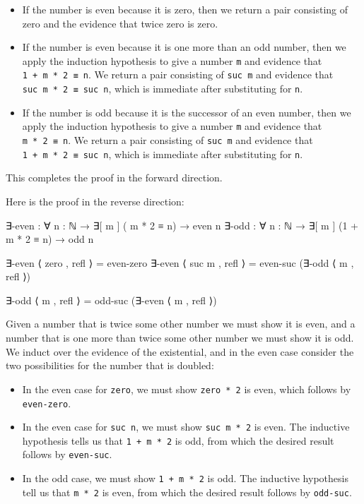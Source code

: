 \begin{itemize}
\item
  If the number is even because it is zero, then we return a pair
  consisting of zero and the evidence that twice zero is zero.
\item
  If the number is even because it is one more than an odd number, then
  we apply the induction hypothesis to give a number \texttt{m} and
  evidence that \texttt{1\ +\ m\ *\ 2\ ≡\ n}. We return a pair
  consisting of \texttt{suc\ m} and evidence that
  \texttt{suc\ m\ *\ 2\ ≡\ suc\ n}, which is immediate after
  substituting for \texttt{n}.
\item
  If the number is odd because it is the successor of an even number,
  then we apply the induction hypothesis to give a number \texttt{m} and
  evidence that \texttt{m\ *\ 2\ ≡\ n}. We return a pair consisting of
  \texttt{suc\ m} and evidence that \texttt{1\ +\ m\ *\ 2\ ≡\ suc\ n},
  which is immediate after substituting for \texttt{n}.
\end{itemize}

This completes the proof in the forward direction.

Here is the proof in the reverse direction:

\begin{fence}
\begin{code}
∃-even : ∀ {n : ℕ} → ∃[ m ] (    m * 2 ≡ n) → even n
∃-odd  : ∀ {n : ℕ} → ∃[ m ] (1 + m * 2 ≡ n) →  odd n

∃-even ⟨  zero , refl ⟩  =  even-zero
∃-even ⟨ suc m , refl ⟩  =  even-suc (∃-odd ⟨ m , refl ⟩)

∃-odd  ⟨     m , refl ⟩  =  odd-suc (∃-even ⟨ m , refl ⟩)
\end{code}
\end{fence}

Given a number that is twice some other number we must show it is even,
and a number that is one more than twice some other number we must show
it is odd. We induct over the evidence of the existential, and in the
even case consider the two possibilities for the number that is doubled:

\begin{itemize}
\item
  In the even case for \texttt{zero}, we must show \texttt{zero\ *\ 2}
  is even, which follows by \texttt{even-zero}.
\item
  In the even case for \texttt{suc\ n}, we must show
  \texttt{suc\ m\ *\ 2} is even. The inductive hypothesis tells us that
  \texttt{1\ +\ m\ *\ 2} is odd, from which the desired result follows
  by \texttt{even-suc}.
\item
  In the odd case, we must show \texttt{1\ +\ m\ *\ 2} is odd. The
  inductive hypothesis tell us that \texttt{m\ *\ 2} is even, from which
  the desired result follows by \texttt{odd-suc}.
\end{itemize}

